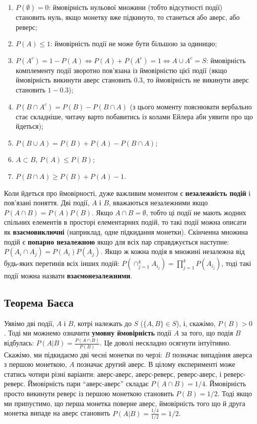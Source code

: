 \documentclass[
  11pt,
]{book}
\providecommand{\tightlist}{%
  \setlength{\itemsep}{0pt}\setlength{\parskip}{0pt}}
\begin{document}
\begin{enumerate}
\def\labelenumi{\arabic{enumi}.}
\tightlist
\item
  \(P(\emptyset) = 0\): ймовірність нульової множини (тобто відсутності
  події) становить нуль, якщо монетку вже підкинуто, то станеться або
  аверс, або реверс;
\item
  \(P(A) \leq 1\): ймовірність події не може бути більшою за одиницю;
\item
  \(P(A^c) = 1 - P(A) \Leftrightarrow P(A) + P(A^c) = 1 \Leftrightarrow A \cup A^c = S\):
  ймовірність комплементу події зворотно пов'язана із ймовірністю цієї
  події (якщо ймовірність викинути аверс становить \(0.3\), то
  ймовірність не викинути аверс становить \(1-0.3\));
\item
  \(P(B \cap A^c) = P(B) - P(B\cap A)\) (з цього моменту пояснювати
  вербально стає складніше, читачу варто побавитись із колами Ейлера аби
  уявити про що йдеться);
\item
  \(P(B \cup A) = P(B) + P(A) - P(B\cap A)\);
\item
  \(A \subset B\), \(P(A) \leq P(B)\);
\item
  \(P(B \cap A) \geq P(B) + P(A) - 1\).
\end{enumerate}

Коли йдеться про ймовірності, дуже важливим моментом є
\textbf{незалежність подій} і пов'язані поняття. Дві події, \(A\) і
\(B\), вважаються незалежними якщо \(P(A \cap B) = P(A) P(B)\). Якщо
\(A \cap B = \emptyset\), тобто ці події не мають жодних спільних
елементів в просторі елементарних подій, то такі події можна описати як
\textbf{взаємовиключні} (наприклад, одне підкидання монетки). Скінченна
множина подій є \textbf{попарно незалежною} якщо для всіх пар
справджується наступне: \(P(A_i \cap A_j) = P(A_i)P(A_j)\). Якщо ж кожна
подія в множині незалежна від будь-яких перетинів всіх інших подій:
\(P(\cap_{j=1}^k A_{i_j}) = \prod_{j=1}^k P(A_{i_j})\), тоді такі події
можна назвати \textbf{взаємонезалежними}.

\subsection{Теорема
Баєса}\label{ux442ux435ux43eux440ux435ux43cux430-ux431ux430ux454ux441ux430}

Уявімо дві події, \(A\) і \(B\), котрі належать до \(S\)
(\(\{A, B\} \in S\)), і, скажімо, \(P(B) > 0\). Тоді ми можнемо означити
\textbf{умовну ймовірність} події \(A\) за того, що подія \(B\)
відбулась: \(P(A|B) = \frac{P(A \cap B)}{P(B)}\). Це доволі нескладно
осягнути інтуїтивно. Скажімо, ми підкидаємо дві чесні монетки по черзі:
\(B\) позначає випадіння аверса з першою монеткою, \(A\) позначає другий
аверс. В цілому експерименті може статись чотири різні варіанти:
аверс-аверс, аверс-реверс, реверс-аверс, і реверс-реверс. Ймовірність
пари ``аверс-аверс'' складає \(P(A \cap B) = 1/4\). Ймовірність просто
викинути реверс із першою монеткою становить \(P(B) = 1/2\). Тоді якщо
ми припустимо, що перша монетка поверне аверс, ймовірність того що й
друга монетка випаде на аверс становить
\(P(A | B) = \frac{1/4}{1/2} = 1/2\).
\end{document}
